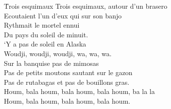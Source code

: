 \documentclass{novel}
\begin{document}
{\begin{minipage}[t][0.5\textheight][t]{\textwidth}
\vspace{0.00\textheight}
\h*{Trois esquimaux}
Trois esquimaux, autour d’un brasero \\
Ecoutaient l’un d’eux qui sur son banjo \\
Rythmait le mortel ennui \\
Du pays du soleil de minuit. \\
‘Y a pas de soleil en Alaska \\
Woudji, woudji, woudji, wa, wa, wa. \\
Sur la banquise pas de mimosas \\
Pas de petits moutons sautant sur le gazon \\
Pas de rutabagas et pas de bouillons gras. \\
Houm, bala houm, bala houm, bala houm, ba la la \\
Houm, bala houm, bala houm, bala houm.
\end{minipage}

}
\end{document}
